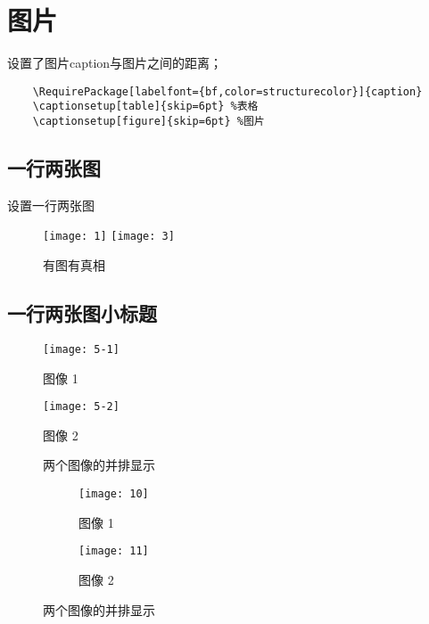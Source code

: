 \chapter{图片}


设置了图片caption与图片之间的距离；
\begin{lstlisting}
    \RequirePackage[labelfont={bf,color=structurecolor}]{caption} 
    \captionsetup[table]{skip=6pt} %表格
    \captionsetup[figure]{skip=6pt} %图片
\end{lstlisting}

\section{一行两张图}
设置一行两张图
\begin{figure}[htbp]
    \centering
    \texttt{[image: 1]}
    \hspace*{1cm}
    \texttt{[image: 3]}
    \caption{有图有真相}
    \label{fig:myphoto}
\end{figure}


\section{一行两张图小标题}


\begin{figure}[!htbp]
    \centering
    \begin{minipage}[t]{0.45\textwidth}
        \centering
        \texttt{[image: 5-1]} %
        \caption{图像 1}
        \label{fig1a}
    \end{minipage}
    \begin{minipage}[t]{0.45\textwidth}
        \centering
        \texttt{[image: 5-2]} %
        \caption{图像 2}
        \label{fig1b}
    \end{minipage}
    \caption{两个图像的并排显示}
    \label{fig1}
\end{figure}



\begin{figure}[!htbp]
    \centering
    \begin{subfigure}[b]{0.45\textwidth}
        \centering
        \texttt{[image: 10]} %
        \caption{图像 1}
        \label{fig:sub1}
    \end{subfigure}
    \hspace*{1cm}
    \begin{subfigure}[b]{0.45\textwidth}
        \centering
        \texttt{[image: 11]} %
        \caption{图像 2}
        \label{fig:sub2}
    \end{subfigure}
    \caption{两个图像的并排显示}
    \label{fig:main}
\end{figure}